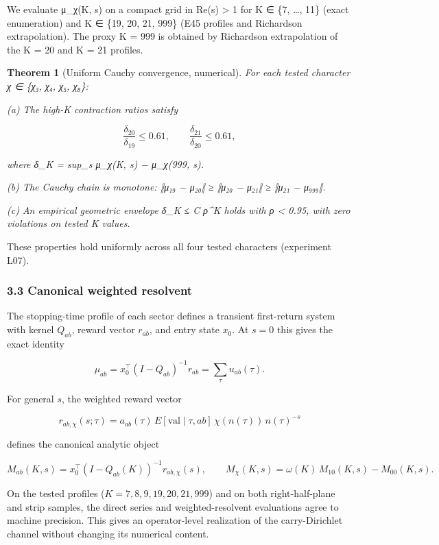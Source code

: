 \documentclass[
  11pt,
]{article}
\begin{document}
We evaluate μ\_χ(K, s) on a compact grid in Re(s) \textgreater{} 1 for K ∈ \{7,
\ldots, 11\} (exact enumeration) and K ∈ \{19, 20, 21, 999\} (E45 profiles and
Richardson extrapolation). The proxy K = 999 is obtained by Richardson
extrapolation of the K = 20 and K = 21 profiles.

\textbf{Theorem 1} (Uniform Cauchy convergence, numerical). \emph{For each
tested character χ ∈ \{χ₃, χ₄, χ₅, χ₈\}:}

\emph{(a) The high-K contraction ratios satisfy}

\[\frac{\delta_{20}}{\delta_{19}} \leq 0.61, \qquad \frac{\delta_{21}}{\delta_{20}} \leq 0.61,\]

\emph{where δ\_K = sup\_s \textbar μ\_χ(K, s) − μ\_χ(999, s)\textbar.}

\emph{(b) The Cauchy chain is monotone: ‖μ₁₉ − μ₂₀‖ ≥ ‖μ₂₀ − μ₂₁‖ ≥ ‖μ₂₁ −
μ₉₉₉‖.}

\emph{(c) An empirical geometric envelope δ\_K ≤ C ρ\^{}K holds with ρ
\textless{} 0.95, with zero violations on tested K values.}

These properties hold uniformly across all four tested characters (experiment
L07).

\subsubsection{3.3 Canonical weighted
resolvent}\label{canonical-weighted-resolvent}

The stopping-time profile of each sector defines a transient first-return system
with kernel \(Q_{ab}\), reward vector \(r_{ab}\), and entry state \(x_0\). At
\(s = 0\) this gives the exact identity

\[\mu_{ab}=x_0^\top (I-Q_{ab})^{-1} r_{ab}=\sum_\tau u_{ab}(\tau).\]

For general \(s\), the weighted reward vector

\[r_{ab,\chi}(s;\tau)=a_{ab}(\tau)\,E[\mathrm{val}\mid\tau,ab]\,\chi(n(\tau))\,n(\tau)^{-s}\]

defines the canonical analytic object

\[M_{ab}(K,s)=x_0^\top (I-Q_{ab}(K))^{-1} r_{ab,\chi}(s), \qquad
M_\chi(K,s)=\omega(K)\,M_{10}(K,s)-M_{00}(K,s).\]

On the tested profiles (\(K = 7, 8, 9, 19, 20, 21, 999\)) and on both
right-half-plane and strip samples, the direct series and weighted-resolvent
evaluations agree to machine precision. This gives an operator-level realization
of the carry-Dirichlet channel without changing its numerical content.
\end{document}
